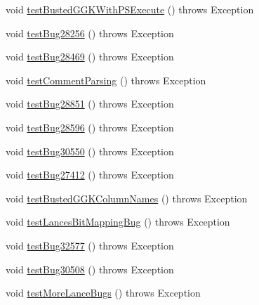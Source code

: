 \begin{DoxyCompactItemize}
\item 
void \mbox{\hyperlink{classtestsuite_1_1regression_1_1_statement_regression_test_a4f411a83be8c28b4a75b6292e50e00d7}{test\+Busted\+G\+G\+K\+With\+P\+S\+Execute}} ()  throws Exception 
\item 
void \mbox{\hyperlink{classtestsuite_1_1regression_1_1_statement_regression_test_a45f6666d2a8fbbc59bb210cd6e6f33a5}{test\+Bug28256}} ()  throws Exception 
\item 
void \mbox{\hyperlink{classtestsuite_1_1regression_1_1_statement_regression_test_aa43369797070b07cf82bd806ef218255}{test\+Bug28469}} ()  throws Exception 
\item 
void \mbox{\hyperlink{classtestsuite_1_1regression_1_1_statement_regression_test_a21dd6e188a7b72c29bcab2bbd7cabbeb}{test\+Comment\+Parsing}} ()  throws Exception 
\item 
void \mbox{\hyperlink{classtestsuite_1_1regression_1_1_statement_regression_test_a466a50de4804c830422e6b7e6a9c9653}{test\+Bug28851}} ()  throws Exception 
\item 
void \mbox{\hyperlink{classtestsuite_1_1regression_1_1_statement_regression_test_a1d616199f65aad8a199b762687ef4880}{test\+Bug28596}} ()  throws Exception 
\item 
void \mbox{\hyperlink{classtestsuite_1_1regression_1_1_statement_regression_test_a04e7c997d4e285f4538f897d61c1110e}{test\+Bug30550}} ()  throws Exception 
\item 
void \mbox{\hyperlink{classtestsuite_1_1regression_1_1_statement_regression_test_a8fe44dff0f28bc878c51eb27e789c9b4}{test\+Bug27412}} ()  throws Exception 
\item 
void \mbox{\hyperlink{classtestsuite_1_1regression_1_1_statement_regression_test_a26becb1c5466427e8a1b403274a72a73}{test\+Busted\+G\+G\+K\+Column\+Names}} ()  throws Exception 
\item 
void \mbox{\hyperlink{classtestsuite_1_1regression_1_1_statement_regression_test_a2774bec021fba29b36078391bb2d3363}{test\+Lances\+Bit\+Mapping\+Bug}} ()  throws Exception 
\item 
void \mbox{\hyperlink{classtestsuite_1_1regression_1_1_statement_regression_test_a46c9677cc1878bfd4f5da911d30cac02}{test\+Bug32577}} ()  throws Exception 
\item 
void \mbox{\hyperlink{classtestsuite_1_1regression_1_1_statement_regression_test_a7cb27931fda37ceec6733fcd0e95ced5}{test\+Bug30508}} ()  throws Exception 
\item 
void \mbox{\hyperlink{classtestsuite_1_1regression_1_1_statement_regression_test_afd9228e69b7dd6bbe30d716cebeac729}{test\+More\+Lance\+Bugs}} ()  throws Exception 

\end{DoxyCompactItemize}
